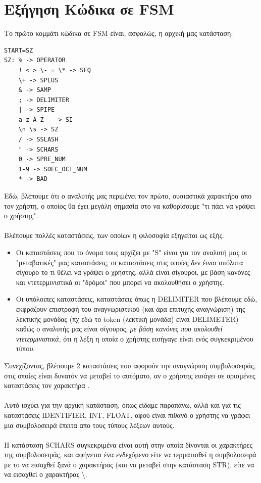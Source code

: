 \documentclass[14pt]{extarticle}
\begin{document}
\section{Εξήγηση Κώδικα σε \textlatin{FSM}}
Το πρώτο κομμάτι κώδικα σε \textlatin{FSM} είναι, ασφαλώς, η αρχική μας κατάσταση:
    \begin{lstlisting}
START=SZ
SZ: % -> OPERATOR
    ! < > \- = \* -> SEQ
    \+ -> SPLUS
    & -> SAMP
    ; -> DELIMITER
    | -> SPIPE
    a-z A-Z _ -> SI
    \n \s -> SZ
    / -> SSLASH
    " -> SCHARS
    0 -> SPRE_NUM
    1-9 -> SDEC_OCT_NUM
    * -> BAD
    \end{lstlisting}
Εδώ, βλέπουμε ότι ο αναλυτής μας περιμένει τον πρώτο, ουσιαστικά χαρακτήρα απο τον χρήστη, ο οποίος θα έχει μεγάλη σημασία στο να καθορίσουμε "τι πάει να γράψει ο χρήστης".
\\
\\
Βλέπουμε πολλές καταστάσεις, των οποίων η φιλοσοφία εξηγείται ως εξής.
\begin{itemize}
  \item Οι καταστάσεις που το όνομα τους αρχίζει με \textlatin{"S"} είναι για τον αναλυτή μας οι "μεταβατικές" μας καταστάσεις, οι καταστάσεις στις οποίες δεν έιναι απόλυτα σίγουρο το τι θέλει να γράψει ο χρήστης, αλλά είναι σίγουροι, με βάση κανόνες και ντετερμινιστικά οι "δρόμοι" που μπορεί να ακολουθήσει ο χρήστης. 
  \item Οι υπόλοιπες καταστάσεις, καταστάσεις όπως η \textlatin{DELIMITER} που βλέπουμε εδώ, εκφράζουν επιστροφή του αναγνωριστικού (και άρα επιτυχής αναγνώριση) της λεκτικής μονάδας (πχ εδώ το \textlatin{token} (λεκτική μονάδα) είναι \textlatin{DELIMETER}) καθώς ο αναλυτής μας είναι σίγουρος, \emph{με βάση κανόνες που ακολουθεί ντετερμινιστικά}, ότι η λέξη η οποία ο χρήστης εισήγαγε είναι ενός συγκεκριμένου τύπου.  
\end{itemize}
\clearpage
Συνεχίζοντας, βλέπουμε 2 καταστάσεις που αφορούν την αναγνώριση συμβολοσειράς, στις οποίες είναι δυνατόν να μεταβεί το αυτόματο, αν ο χρήστης εισάγει σε ορισμένες καταστάσεις τον χαρακτήρα .
\\
\\
Αυτό ισχύει για την αρχική κατάσταση, όπως είδαμε παραπάνω, αλλά και για τις καταστάσεις \textlatin{IDENTIFIER, INT, FLOAT}, αφού είναι πιθανό ο χρήστης να γράφει μια συμβολοσειρά έπειτα απο τους τύπους λέξεων αυτούς.
\\
\\
Η κατάσταση \textlatin{SCHARS} συγκεκριμένα είναι αυτή στην οποία δίνονται οι χαρακτήρες της συμβολοσειράς, και αφήνεται ένα ενδεχόμενο είτε να τερματισθεί η συμβολοσειρά με το να εισαχθεί ξανά ο χαρακτήρας  (και να μεταβεί στην κατάσταση \textlatin{STR}), είτε να να εισαχθεί ο χαρακτήρας \textbackslash.
\end{document}
